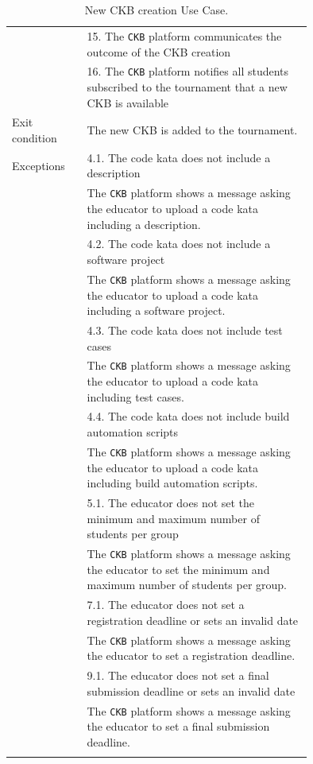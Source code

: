 \begin{center}
\begin{longtable}{lp{0.75\linewidth}}
        & 15. The \verb|CKB| platform communicates the outcome of the CKB creation\\
        & 16. The \verb|CKB| platform notifies all students subscribed to the tournament that a new CKB is available\\
        \hline
        Exit condition   & The new CKB is added to the tournament.   \\                                                                                                                                                                         
        \hline
        Exceptions   
        & 4.1. The code kata does not include a description\\
            & The \verb|CKB| platform shows a message asking the educator to upload a code kata including a description.  \\
        & 4.2. The code kata does not include a software project\\
            & The \verb|CKB| platform shows a message asking the educator to upload a code kata including a software project.  \\
        & 4.3. The code kata does not include test cases\\
            & The \verb|CKB| platform shows a message asking the educator to upload a code kata including test cases.  \\
        & 4.4. The code kata does not include build automation scripts\\
            & The \verb|CKB| platform shows a message asking the educator to upload a code kata including build automation scripts.  \\
        & 5.1. The educator does not set the minimum and maximum number of students per group\\
            & The \verb|CKB| platform shows a message asking the educator to set the minimum and maximum number of students per group.  \\
        & 7.1. The educator does not set a registration deadline or sets an invalid date\\
            & The \verb|CKB| platform shows a message asking the educator to set a registration deadline.  \\
        & 9.1. The educator does not set a final submission deadline or sets an invalid date\\
            & The \verb|CKB| platform shows a message asking the educator to set a final submission deadline.  \\
        \hline
        \caption{New CKB creation Use Case.}
        \label{tab: new_CKB_use_case}
    \end{longtable}


\end{center}
